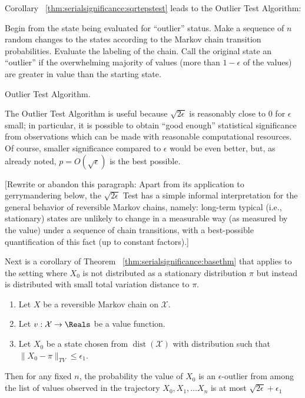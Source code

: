 \documentclass[12pt]{article}
\begin{document}
Corollary~%
\ref{thm:serialsignificance:sqrtepstest} leads to the Outlier Test Algorithm:%

\begin{algorithm}[H]
      Begin from the state being evaluated
    for ``outlier'' status.\; Make a sequence of \( n \) random changes
    to the states according to the Markov chain transition
    probabilities.\; Evaluate the labeling of the chain.\; Call the
    original state an ``outlier'' if the overwhelming majority of values
    (more than \( 1 - \epsilon \) of the values) are greater in value
    than the starting state.\;
    \caption{Outlier Test Algorithm.}
\end{algorithm}

The Outlier Test Algorithm is useful because \( \sqrt{2\epsilon} \) is
reasonably close to \( 0 \) for \( \epsilon \) small; in particular, it
is possible to obtain ``good enough'' statistical significance from
observations which can be made with reasonable computational resources.
Of course, smaller significance compared to \( \epsilon \) would be even
better, but, as already noted, \( p = O(\sqrt{\epsilon}) \) is the best
possible.

[Rewrite or abandon this paragraph:
Apart from its application to gerrymandering below, the \( \sqrt{2\epsilon}
\) Test has a simple informal interpretation for the general behavior of
reversible Markov chains, namely:  long-term typical (i.e., stationary)
states are unlikely to change in a measurable way (as measured by the
value) under a sequence of chain transitions, with a best-possible
quantification of this fact (up to constant factors).]

Next is a corollary of Theorem~%
\ref{thm:serialsignificance:basethm} that applies to the setting where \( X_0 \)
is not distributed as a stationary distribution \( \pi \) but instead is
distributed with small total variation distance to \( \pi \).

\begin{corollary}
    \begin{enumerate}
        \item
            Let \( X \) be a reversible Markov chain on \( \mathcal{X} \).
        \item
            Let \( v :  \mathcal{X} \to \Reals \) be a value function.
        \item
            Let \( X_0 \) be a state chosen from \( \operatorname{dist}(\mathcal{X}) \) with
            distribution such that \( \| X_0 - \pi \|_{TV} \le \epsilon_1
            \).
    \end{enumerate}
    Then for any fixed \( n \), the probability the value of \( X_0 \)
    is an \( \epsilon \)-outlier from among the list of values observed
    in the trajectory \( X_0, X_1, \dots X_n \) is at most \( \sqrt{2\epsilon}
    + \epsilon_1 \)
\end{corollary}
\end{document}
